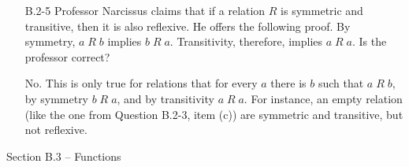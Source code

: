 \documentclass{report}
\makeatletter
\renewenvironment{framed}{%
 \def\FrameCommand##1{\hskip\@totalleftmargin
 \fboxsep=\FrameSep\fbox{##1}}%
 \MakeFramed {\advance\hsize-\width
   \@totalleftmargin\z@ \linewidth\hsize
   \@setminipage}}%
 {\par\unskip\endMakeFramed}
\makeatother
\begin{document}
\begin{enumerate}
\item[B.2{-}5]{Professor Narcissus claims that if a relation $R$ is symmetric
and transitive, then it is also reflexive. He offers the following proof. By
symmetry, $a\;R\;b$ implies $b\;R\;a$. Transitivity, therefore, implies
$a\;R\;a$. Is the professor correct?}

\begin{framed}
No. This is only true for relations that for every $a$ there is $b$ such that
$a\;R\;b$, by symmetry $b\;R\;a$, and by transitivity $a\;R\;a$. For
instance, an empty relation (like the one from Question B.2-3, item (c)) are
symmetric and transitive, but not reflexive.
\end{framed}

\end{enumerate}

\newpage

{\large Section B.3 {--} Functions}
\end{document}
